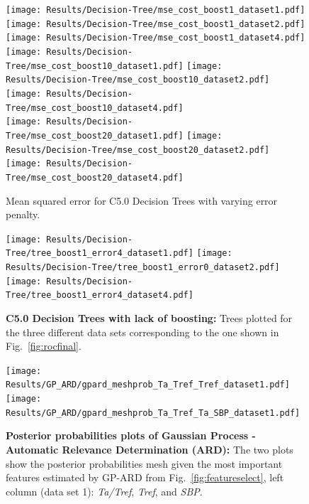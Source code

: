 \documentclass{article}
\begin{document}
\begin{figure}
  \texttt{[image: Results/Decision-Tree/mse\_cost\_boost1\_dataset1.pdf]}\hspace{-0.3cm}
  \texttt{[image: Results/Decision-Tree/mse\_cost\_boost1\_dataset2.pdf]}\hspace{-0.3cm}
    \texttt{[image: Results/Decision-Tree/mse\_cost\_boost1\_dataset4.pdf]} \\
  \texttt{[image: Results/Decision-Tree/mse\_cost\_boost10\_dataset1.pdf]}\hspace{-0.3cm}
  \texttt{[image: Results/Decision-Tree/mse\_cost\_boost10\_dataset2.pdf]}\hspace{-0.3cm}
    \texttt{[image: Results/Decision-Tree/mse\_cost\_boost10\_dataset4.pdf]} \\
  \texttt{[image: Results/Decision-Tree/mse\_cost\_boost20\_dataset1.pdf]}\hspace{-0.3cm}
  \texttt{[image: Results/Decision-Tree/mse\_cost\_boost20\_dataset2.pdf]}\hspace{-0.3cm}
    \texttt{[image: Results/Decision-Tree/mse\_cost\_boost20\_dataset4.pdf]} \\
    \caption{\label{fig:decisiontree_mse}
      Mean squared error for C5.0 Decision Trees with varying error penalty. }
\end{figure}


\begin{figure}
  \texttt{[image: Results/Decision-Tree/tree\_boost1\_error4\_dataset1.pdf]} \hspace{-0.3cm}
  \texttt{[image: Results/Decision-Tree/tree\_boost1\_error0\_dataset2.pdf]}  \hspace{-0.3cm}
  \texttt{[image: Results/Decision-Tree/tree\_boost1\_error4\_dataset4.pdf]}  \hspace{-0.3cm}
\caption{\label{fig:decisiontree}\textbf{C5.0 Decision Trees with lack of boosting:} Trees plotted for the three different data sets corresponding to the one shown in Fig.~\ref{fig:rocfinal}. }
\end{figure}


\begin{figure}
\texttt{[image: Results/GP\_ARD/gpard\_meshprob\_Ta\_Tref\_Tref\_dataset1.pdf]}
\texttt{[image: Results/GP\_ARD/gpard\_meshprob\_Ta\_Tref\_Ta\_SBP\_dataset1.pdf]}
\caption{\textbf{Posterior probabilities plots of Gaussian Process - Automatic Relevance Determination (ARD):}  The two plots show the posterior probabilities mesh given the most important features estimated by GP-ARD from Fig.~\ref{fig:featureselect}, left column (data set 1): \textit{Ta/Tref}, \textit{Tref}, and \textit{SBP}.
  }
\end{figure}
\end{document}
